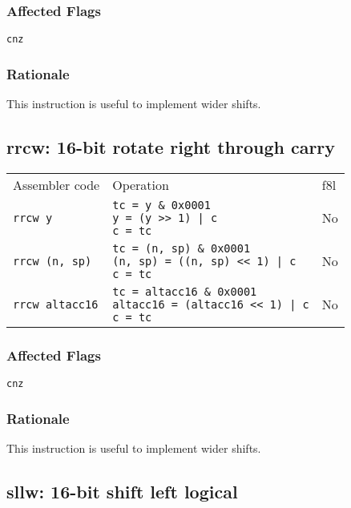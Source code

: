 \documentclass{book}
\begin{document}
\subsubsection*{Affected Flags}

\texttt{cnz}

\subsubsection*{Rationale}

This instruction is useful to implement wider shifts.


\subsection{rrcw: 16-bit rotate right through carry}

\begin{tabular}{l l l}
Assembler code         & Operation                                                                                              & f8l \\
\texttt{rrcw y}        & \makecell{\texttt{tc = y \& 0x0001}\\\texttt{y = (y >> 1) | c}\\\texttt{c = tc}}                      & No \\
\texttt{rrcw (n, sp)}  & \makecell{\texttt{tc = (n, sp) \& 0x0001}\\\texttt{(n, sp) = ((n, sp) << 1) | c}\\\texttt{c = tc}}    & No \\
\texttt{rrcw altacc16} & \makecell{\texttt{tc = altacc16 \& 0x0001}\\\texttt{altacc16 = (altacc16 << 1) | c}\\\texttt{c = tc}} & No
\end{tabular}

\subsubsection*{Affected Flags}

\texttt{cnz}

\subsubsection*{Rationale}

This instruction is useful to implement wider shifts.


\subsection{sllw: 16-bit shift left logical}
\end{document}
